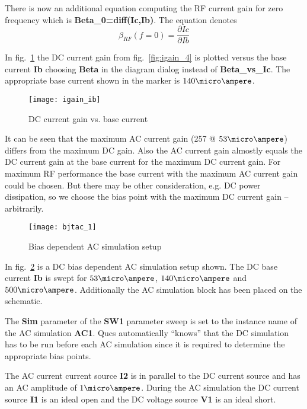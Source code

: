 There is now an additional equation computing the RF current gain for
zero frequency which is \textbf{Beta\_0=diff(Ic,Ib)}.  The equation
denotes
\begin{equation*}
\beta_{RF}\left(f=0\right) = \dfrac{\partial Ic}{\partial Ib}
\end{equation*}

In fig.~\ref{fig:igain_ib} the DC current gain from
fig.~\ref{fig:igain_4} is plotted versus the base current \textbf{Ib}
choosing \textbf{Beta} in the diagram dialog instead of
\textbf{Beta\_vs\_Ic}.  The appropriate base current shown in the
marker is $140\micro\ampere$.

\begin{figure}[ht]
  \centering
  \texttt{[image: igain\_ib]}
  \caption{DC current gain vs. base current}
  \label{fig:igain_ib}
\end{figure}
\FloatBarrier

It can be seen that the maximum AC current gain (257 @
$53\micro\ampere$) differs from the maximum DC gain.  Also the AC
current gain almostly equals the DC current gain at the base current
for the maximum DC current gain.  For maximum RF performance the base
current with the maximum AC current gain could be chosen.  But there
may be other consideration, e.g. DC power dissipation, so we choose
the bias point with the maximum DC current gain -- arbitrarily.

\begin{figure}[ht]
  \centering
  \texttt{[image: bjtac\_1]}
  \caption{Bias dependent AC simulation setup}
  \label{fig:bjtac_1}
\end{figure}
\FloatBarrier

In fig.~\ref{fig:bjtac_1} is a DC bias dependent AC simulation setup
shown.  The DC base current \textbf{Ib} is swept for
$53\micro\ampere$, $140\micro\ampere$ and $500\micro\ampere$.
Additionally the AC simulation block has been placed on the schematic.

\medskip

The \textbf{Sim} parameter of the \textbf{SW1} parameter sweep is set
to the instance name of the AC simulation \textbf{AC1}.  Qucs
automatically ``knows'' that the DC simulation has to be run before
each AC simulation since it is required to determine the appropriate
bias points.

\medskip

The AC current current source \textbf{I2} is in parallel to the DC
current source and has an AC amplitude of $1\micro\ampere$.  During
the AC simulation the DC current source \textbf{I1} is an ideal open
and the DC voltage source \textbf{V1} is an ideal short.

